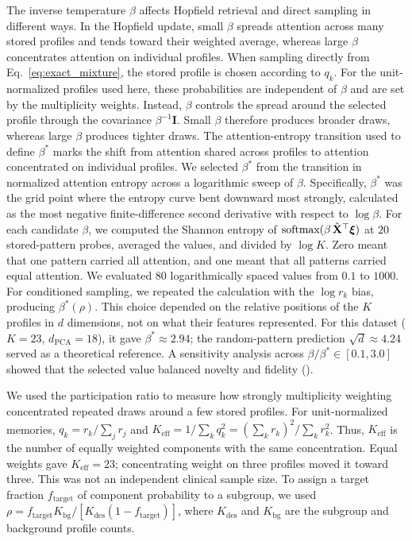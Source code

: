 The inverse temperature $\beta$ affects Hopfield retrieval and direct sampling in
different ways. In the Hopfield update, small $\beta$ spreads attention across many stored
profiles and tends toward their weighted average, whereas large $\beta$ concentrates attention on
individual profiles. When sampling directly from Eq.~\eqref{eq:exact_mixture}, the stored
profile is chosen according to $q_k$. For the unit-normalized profiles used here, these
probabilities are independent of $\beta$ and are set by the multiplicity weights. Instead,
$\beta$ controls the spread around the selected profile through the covariance
$\beta^{-1}\mathbf{I}$. Small $\beta$ therefore produces broader draws, whereas large $\beta$
produces tighter draws. The attention-entropy transition used to define $\beta^*$ marks the
shift from attention shared across profiles to attention concentrated on individual profiles.
We selected $\beta^*$ from the transition in normalized attention entropy across a
logarithmic sweep of $\beta$. Specifically, $\beta^*$ was the grid point where the entropy
curve bent downward most strongly, calculated as the most negative finite-difference second
derivative with respect to $\log\beta$. For each candidate $\beta$, we computed the Shannon
entropy of $\text{softmax}(\beta\,\hat{\mathbf{X}}^\top\boldsymbol{\xi})$ at $20$ stored-pattern probes, averaged
the values, and divided by $\log K$. Zero meant that one pattern carried all attention, and
one meant that all patterns carried equal attention. We evaluated $80$ logarithmically spaced
values from $0.1$ to $1000$. For conditioned sampling, we repeated the calculation with the
$\log r_k$ bias, producing $\beta^*(\rho)$. This choice depended on the relative positions of
the $K$ profiles in $d$ dimensions, not on what their features represented. For this dataset
($K{=}23$, $d_{\text{PCA}}{=}18$), it gave $\beta^*\approx2.94$; the random-pattern prediction
$\sqrt{d}\approx4.24$ served as a theoretical reference. A sensitivity analysis across
$\beta/\beta^*\in[0.1,3.0]$ showed that the selected value balanced novelty and
fidelity ().

We used the participation ratio to measure how strongly multiplicity weighting
concentrated repeated draws around a few stored profiles. For unit-normalized memories,
$q_k=r_k/\sum_j r_j$ and
$K_{\text{eff}}=1/\sum_k q_k^2=(\sum_k r_k)^2/\sum_k r_k^2$. Thus,
$K_{\text{eff}}$ is the number of equally weighted components with the same concentration.
Equal weights gave $K_{\text{eff}}=23$; concentrating weight on three profiles moved it toward
three. This was not an independent clinical sample size. To assign a target fraction
$f_{\text{target}}$ of component probability to a subgroup, we used
$\rho=f_{\text{target}}K_{\text{bg}}/[K_{\text{des}}(1-f_{\text{target}})]$, where
$K_{\text{des}}$ and $K_{\text{bg}}$ are the subgroup and background profile counts.


